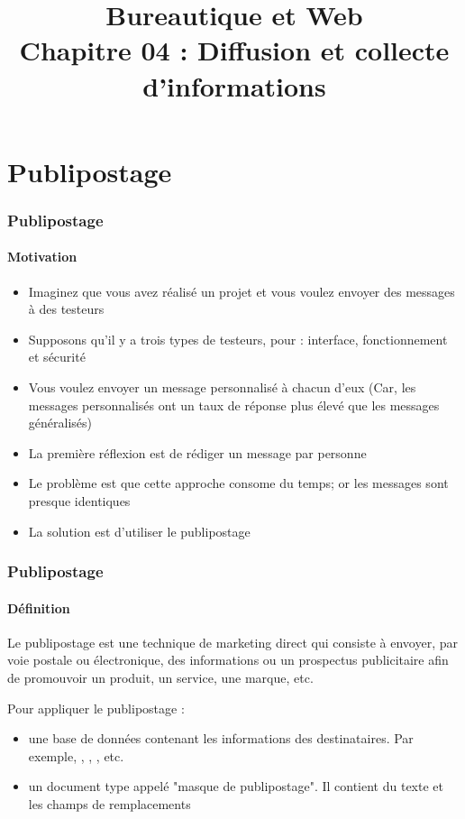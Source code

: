 \documentclass[xcolor=table]{beamer}
\title[BWEB : 03- Diffusion et collecte] %
{Bureautique et Web \\Chapitre 04 : Diffusion et collecte d'informations}
\begin{document}
%
%

\section{Publipostage}

\begin{frame}
\frametitle{Publipostage}
\framesubtitle{Motivation}

\begin{itemize}
	\item Imaginez que vous avez réalisé un projet et vous voulez envoyer des messages à des testeurs
	\item Supposons qu'il y a trois types de testeurs, pour : interface, fonctionnement et sécurité 
	\item Vous voulez envoyer un message personnalisé à chacun d'eux (Car, les messages personnalisés ont un taux de réponse plus élevé que les messages généralisés) 
	\item La première réflexion est de rédiger un message par personne 
	\item Le problème est que cette approche consome du temps; or les messages sont presque identiques
	\item La solution est d'utiliser le publipostage
\end{itemize}

\end{frame}

\begin{frame}
\frametitle{Publipostage}
\framesubtitle{Définition}

\begin{definition}
	Le publipostage est une technique de marketing direct qui consiste à envoyer, par voie postale ou électronique, des informations ou un prospectus publicitaire afin de promouvoir un produit, un service, une marque, etc.
\end{definition}

Pour appliquer le publipostage : 
\begin{itemize}
	\item une base de données contenant les informations des destinataires. Par exemple, , , , etc.
	\item un document type appelé "masque de publipostage". Il contient du texte et les champs de remplacements	
\end{itemize}

\end{frame}
\end{document}
